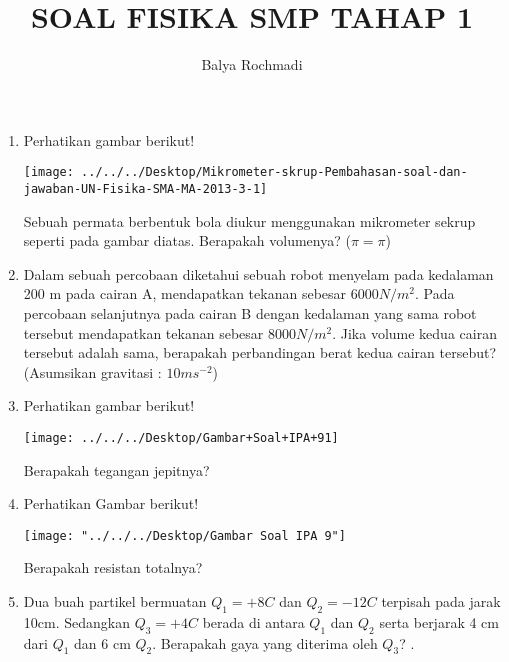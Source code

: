 \documentclass[12pt,a4paper]{exam}
\author{Balya Rochmadi}
\title{SOAL FISIKA SMP TAHAP 1}
\begin{document}
	\maketitle
	\begin{enumerate}
		\item Perhatikan gambar berikut!
			\begin{center}\texttt{[image: ../../../Desktop/Mikrometer-skrup-Pembahasan-soal-dan-jawaban-UN-Fisika-SMA-MA-2013-3-1]}\end{center}
			Sebuah permata berbentuk bola diukur menggunakan mikrometer sekrup seperti pada gambar diatas. Berapakah volumenya? ($\pi=\pi$)
		\item Dalam sebuah percobaan diketahui sebuah robot menyelam pada kedalaman 200 m pada cairan A, mendapatkan tekanan sebesar $6000 N/m^2$. Pada percobaan selanjutnya pada cairan B dengan kedalaman yang sama robot tersebut mendapatkan tekanan sebesar $8000 N/m^2$. Jika volume kedua cairan tersebut adalah sama, berapakah perbandingan berat kedua cairan tersebut? (Asumsikan gravitasi : $10 ms^{-2}$)
		\item Perhatikan gambar berikut!
	\begin{center}
		\texttt{[image: ../../../Desktop/Gambar+Soal+IPA+91]}
	\end{center}
		Berapakah tegangan jepitnya?
		\item Perhatikan Gambar berikut!
		
		\begin{center}
			\texttt{[image: "../../../Desktop/Gambar Soal IPA 9"]}
		\end{center}
		Berapakah resistan totalnya?
		\item Dua buah partikel bermuatan $Q_1=+8C$ dan $Q_2=-12C$ terpisah pada jarak 10cm. Sedangkan $Q_3=+4C$ berada di antara $Q_1$ dan $Q_2$ serta berjarak 4 cm dari $Q_1$ dan 6 cm $Q_2$. Berapakah gaya yang diterima oleh $Q_3$?
		. 
	\end{enumerate}
\end{document}
